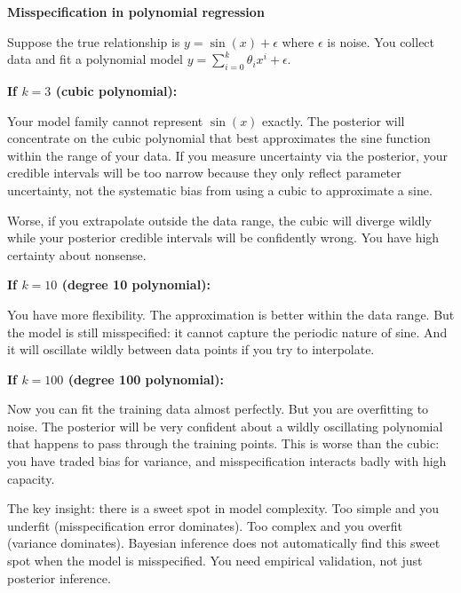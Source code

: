 \begin{examplebox}
\textbf{Misspecification in polynomial regression}

\vspace{0.5em}

Suppose the true relationship is $y = \sin(x) + \epsilon$ where $\epsilon$ is noise. You collect data and fit a polynomial model $y = \sum_{i=0}^{k} \theta_i x^i + \epsilon$.

\vspace{0.5em}

\textbf{If $k=3$ (cubic polynomial):}

Your model family cannot represent $\sin(x)$ exactly. The posterior will concentrate on the cubic polynomial that best approximates the sine function within the range of your data. If you measure uncertainty via the posterior, your credible intervals will be too narrow because they only reflect parameter uncertainty, not the systematic bias from using a cubic to approximate a sine.

Worse, if you extrapolate outside the data range, the cubic will diverge wildly while your posterior credible intervals will be confidently wrong. You have high certainty about nonsense.

\vspace{0.5em}

\textbf{If $k=10$ (degree 10 polynomial):}

You have more flexibility. The approximation is better within the data range. But the model is still misspecified: it cannot capture the periodic nature of sine. And it will oscillate wildly between data points if you try to interpolate.

\vspace{0.5em}

\textbf{If $k=100$ (degree 100 polynomial):}

Now you can fit the training data almost perfectly. But you are overfitting to noise. The posterior will be very confident about a wildly oscillating polynomial that happens to pass through the training points. This is worse than the cubic: you have traded bias for variance, and misspecification interacts badly with high capacity.

\vspace{0.5em}

The key insight: there is a sweet spot in model complexity. Too simple and you underfit (misspecification error dominates). Too complex and you overfit (variance dominates). Bayesian inference does not automatically find this sweet spot when the model is misspecified. You need empirical validation, not just posterior inference.
\end{examplebox}

